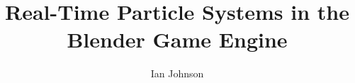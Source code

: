 \documentclass[11pt]{fsuthesis}
\title{Real-Time Particle Systems in the Blender Game Engine}
\author{Ian Johnson}
\begin{document}
\frontmatter
\maketitle
\makesignaturepage



\tableofcontents
\listoffigures


\end{document}
